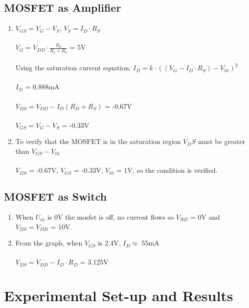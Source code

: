 \documentclass{article}
\begin{document}
		\subsection{MOSFET as Amplifier}
			\begin{enumerate}
				\item 
				\(V_{GS} = V_G - V_S\), \(V_S = I_D \cdot R_S\)\\\\
				\(V_G = V_{DD} \cdot \frac{R_2}{R_1+R_2} \) = 5V\\\\
				Using the saturation current equation: \(I_D = k \cdot ((V_G - I_D \cdot R_S ) - V_{th})^2\)\\\\
				\(I_D \) = 0.888mA\\\\
				\(V_{DS} = V_{DD} - I_D(R_D + R_S) \) = -0.67V\\\\
				\(V_{GS} = V_G -V_S \) = -0.33V\\
				\item To verify that the MOSFET is in the saturation region \(V_DS\) must be greater than \(V_{GS} - V_{th}\)\\\\
				\(V_{DS}\) = -0.67V, \(V_{GS}\) = -0.33V, \(V_{th}\) = 1V, so the condition is verified.
			\end{enumerate}
		\subsection{MOSFET as Switch}
		\begin{enumerate}
			\item When \(U_{in}\) is 0V the mosfet is off, no current flows so \(V_{RD}\) = 0V and \(V_{DS} = V_{DD}\) = 10V.
			\item  From the graph, when \(V_{GS}\) is 2.4V, \(I_D \approx\) 55mA\\\\
			\(V_{DS} = V_{DD} - I_D \cdot R_D\) = 3.125V 
		\end{enumerate}\pagebreak
	\section{Experimental Set-up and Results}
\end{document}
